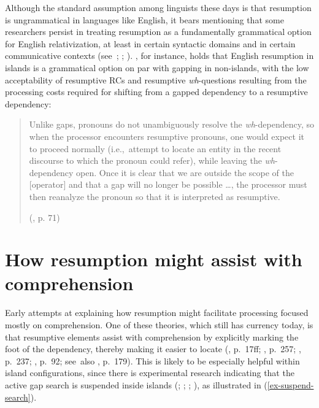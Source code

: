 Although the standard assumption among linguists these days is that resumption is ungrammatical in languages like English, it bears mentioning that some researchers persist in treating resumption as a fundamentally grammatical option for English relativization, at least in certain syntactic domains and in certain communicative contexts (see~\cite{creswell2002}; \cite{goodall2017}; \cite{radford2019}). \textcite{goodall2017}, for instance, holds that English resumption in islands is a grammatical option on par with gapping in non-islands, with the low acceptability of resumptive RCs and resumptive \textit{wh}-questions resulting from the processing costs required for shifting from a gapped dependency to a resumptive dependency:

\begin{samepage}\begin{quote}
Unlike gaps, pronouns do not unambiguously resolve the \textit{wh}-dependency, so when the processor encounters resumptive pronouns, one would expect it to proceed normally (i.e.,~attempt to locate an entity in the recent discourse to which the pronoun could refer), while leaving the \textit{wh}-dependency open. Once it is clear that we are outside the scope of the [operator] and that a gap will no longer be possible \dots{}, the processor must then reanalyze the pronoun so that it is interpreted as resumptive.
\par\vspace{5pt}
\hfill (\cite{goodall2017}, p. 71)
\end{quote}\end{samepage}
\vspace{-12pt}

\section{How resumption might assist with comprehension}\label{res-comprehension}

Early attempts at explaining how resumption might facilitate processing focused mostly on comprehension. One of these theories, which still has currency today, is that resumptive elements assist with comprehension by explicitly marking the foot of the dependency, thereby making it easier to locate (\cite{beltrama.xiang2016}, p.~17ff; \cite{hawkins1999}, p.~257; \cite{hofmeister.norcliffe2013}, p.~237; \cite{keenan.comrie1977}, p.~92; see~also \cite{meltzer-asscher2021}, p.~179). This is likely to be especially helpful within island configurations, since there is experimental research indicating that the active gap search is suspended inside islands (\cite{omaki.schulz2011}; \cite{phillips2006}; \cite{stowe1986}; \cite{traxler.pickering1996}), as illustrated in (\ref{ex-suspend-search}).


